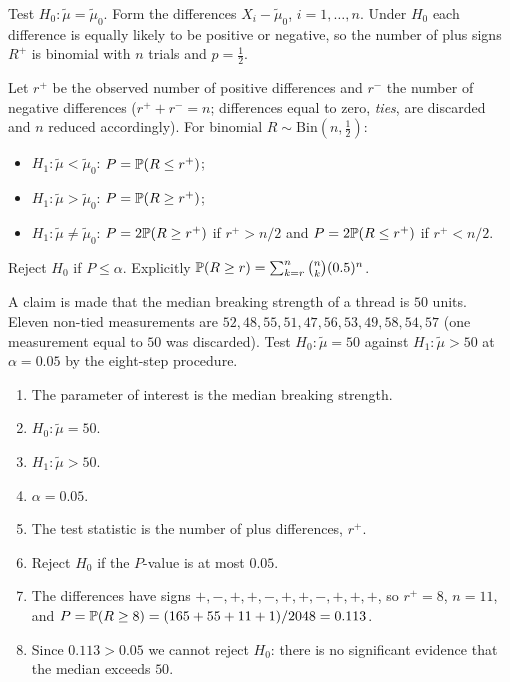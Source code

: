 Test $H_0:\tilde\mu=\tilde\mu_0$. Form the differences $X_i-\tilde\mu_0$, $i=1,\dots,n$. Under $H_0$ each difference is equally likely to be positive or negative, so the number of plus signs $R^+$ is binomial with $n$ trials and $p=\tfrac12$.

\begin{definition}
Let $r^+$ be the observed number of positive differences and $r^-$ the number of negative differences ($r^++r^-=n$; differences equal to zero, \emph{ties}, are discarded and $n$ reduced accordingly). For binomial $R\sim\mathrm{Bin}(n,\tfrac12)$:
\begin{itemize}
  \item $H_1:\tilde\mu<\tilde\mu_0$: $P=\mathbb{P}(R\le r^+)$;
  \item $H_1:\tilde\mu>\tilde\mu_0$: $P=\mathbb{P}(R\ge r^+)$;
  \item $H_1:\tilde\mu\ne\tilde\mu_0$: $P=2\mathbb{P}(R\ge r^+)$ if $r^+>n/2$ and $P=2\mathbb{P}(R\le r^+)$ if $r^+<n/2$.
\end{itemize}
Reject $H_0$ if $P\le\alpha$. Explicitly $\mathbb{P}(R\ge r)=\sum_{k=r}^n\binom nk(0.5)^n$.
\end{definition}

\begin{example}\label{ex:sign}
A claim is made that the median breaking strength of a thread is $50$ units. Eleven non-tied measurements are $52,48,55,51,47,56,53,49,58,54,57$ (one measurement equal to $50$ was discarded). Test $H_0:\tilde\mu=50$ against $H_1:\tilde\mu>50$ at $\alpha=0.05$ by the eight-step procedure.
\begin{enumerate}[label=\arabic*.]
  \item The parameter of interest is the median breaking strength.
  \item $H_0:\tilde\mu=50$.
  \item $H_1:\tilde\mu>50$.
  \item $\alpha=0.05$.
  \item The test statistic is the number of plus differences, $r^+$.
  \item Reject $H_0$ if the $P$-value is at most $0.05$.
  \item The differences have signs $+,-,+,+,-,+,+,-,+,+,+$, so $r^+=8$, $n=11$, and $P=\mathbb{P}(R\ge8)=(165+55+11+1)/2048=0.113$.
  \item Since $0.113>0.05$ we cannot reject $H_0$: there is no significant evidence that the median exceeds $50$.
\end{enumerate}
\end{example}

